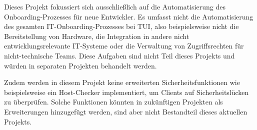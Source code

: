 Dieses Projekt fokussiert sich ausschließlich auf die Automatisierung des Onboarding-Prozesses für neue Entwickler. Es umfasst nicht die Automatisierung des gesamten IT-Onboarding-Prozesses bei TUI, also beispielsweise nicht die Bereitstellung von Hardware, die Integration in andere nicht entwicklungsrelevante IT-Systeme oder die Verwaltung von Zugriffsrechten für nicht-technische Teams. Diese Aufgaben sind nicht Teil dieses Projekts und würden in separaten Projekten behandelt werden.

Zudem werden in diesem Projekt keine erweiterten Sicherheitsfunktionen wie beispielsweise ein Host-Checker implementiert, um Clients auf Sicherheitslücken zu überprüfen. Solche Funktionen könnten in zukünftigen Projekten als Erweiterungen hinzugefügt werden, sind aber nicht Bestandteil dieses aktuellen Projekts.
